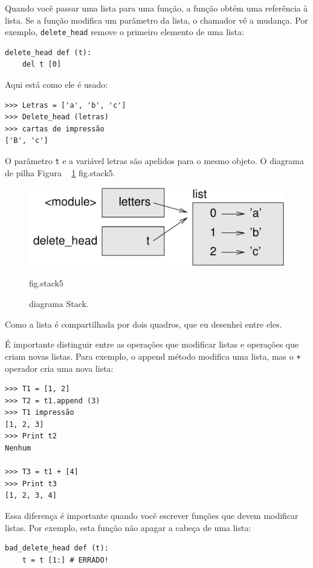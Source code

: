 \documentclass[10pt]{book}
\begin{document}
\begin{exercise}
Quando você passar uma lista para uma função, a função obtém uma referência
à lista.
Se a função modifica um parâmetro da lista, o chamador vê a mudança.
Por exemplo, \verb "delete_head" remove o primeiro elemento de uma lista:

\begin{verbatim}
delete_head def (t):
    del t [0]
\end{verbatim}
%
Aqui está como ele é usado:

\begin{verbatim}
>>> Letras = ['a', 'b', 'c']
>>> Delete_head (letras)
>>> cartas de impressão
['B', 'c']
\end{verbatim}
%
O parâmetro {\tt t} e {a variável letras \tt} são
apelidos para o mesmo objeto. O diagrama de pilha
Figura ~ \ref {} fig.stack5.

\begin{figure}
\centerline
{\includegraphics[scale = 0.8] {figs/stack5.pdf}}
\caption{diagrama Stack.}
\label{} fig.stack5
\end{figure}


Como a lista é compartilhada por dois quadros, que eu desenhei
entre eles.

É importante distinguir entre as operações que
modificar listas e operações que criam novas listas. Para
exemplo, o {\tt} append método modifica uma lista, mas o
{\tt +} operador cria uma nova lista:

\begin{verbatim}
>>> T1 = [1, 2]
>>> T2 = t1.append (3)
>>> T1 impressão
[1, 2, 3]
>>> Print t2
Nenhum

>>> T3 = t1 + [4]
>>> Print t3
[1, 2, 3, 4]
\end{verbatim}

Essa diferença é importante quando você escrever funções que
devem modificar listas. Por exemplo, esta função
{\Em não apagar} a cabeça de uma lista:

\begin{verbatim}
bad_delete_head def (t):
    t = t [1:] # ERRADO!
\end{verbatim}


\end{exercise}
\end{document}
